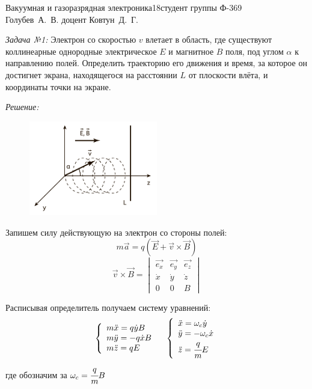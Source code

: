 



\usepackage{wrapfig}


{Вакуумная и газоразрядная электроника}{}{18}{студент группы Ф-369\\Голубев~А.~В.}
{}{доцент Ковтун~Д.~Г.}{}{}

\emph{Задача №1:} Электрон со скоростью \( v \) влетает в область, где 
существуют коллинеарные однородные электрическое \( E \) и магнитное \( B \) 
поля, под углом \( \alpha \) к направлению полей. Определить траекторию 
его движения и время, за которое он достигнет экрана, находящегося на 
расстоянии \( L \) от плоскости влёта, и координаты точки на экране.

\emph{Решение:}

\begin{figure}
    \vspace{-2ex}
    \includegraphics[width=0.5\textwidth]{images/im_01}
\end{figure}

Запишем силу действующую на электрон со стороны полей:
\[
	m\vec{a} = q\left( \vec{E} + \vec{v}\times\vec{B} \right)
\]
\[
	\vec{v}\times\vec{B} = 
	\begin{vmatrix}
		\vec{e_x} & \vec{e_y} & \vec{e_z} \\
		\dot{x}   & \dot{y}   & \dot{z}   \\
		0         & 0         & B
	\end{vmatrix}
\]

Расписывая определитель получаем систему уравнений:
\[
	\left\{ \begin{array}{ll}
		m\ddot{x} = q\dot{y}B \\
		m\ddot{y} = -q\dot{x}B \\
		m\ddot{z} = qE
	\end{array} \right.
	\quad
	\left\{ \begin{array}{ll}
		\ddot{x} = \omega_c\dot{y} \\
		\ddot{y} = -\omega_c\dot{x} \\
		\ddot{z} = \cfrac{q}{m}E
	\end{array} \right.
\]
где обозначим за \( \omega_c = \cfrac{q}{m}B \)

